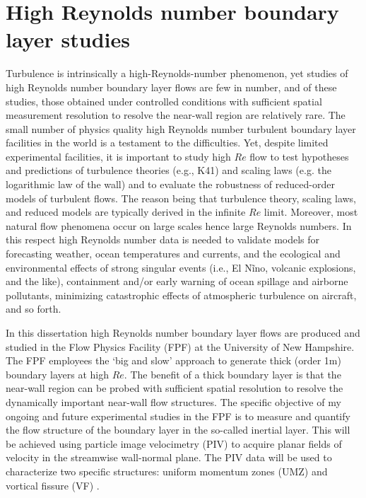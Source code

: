 \section{High Reynolds number boundary layer studies}
Turbulence is intrinsically a high-Reynolds-number phenomenon, yet studies of high Reynolds number boundary layer flows are few in number, and of these studies, those obtained under controlled conditions with sufficient spatial measurement resolution to resolve the near-wall region are relatively rare. The small number of physics quality high Reynolds number turbulent boundary layer facilities in the world is a testament to the difficulties. Yet, despite limited experimental facilities, it is important to study high $Re$ flow to test hypotheses and predictions of turbulence theories (e.g., K41) and scaling laws (e.g. the logarithmic law of the wall) and to evaluate the robustness of reduced-order models of turbulent flows. The reason being that turbulence theory, scaling laws, and reduced models are typically derived in the infinite $Re$ limit. Moreover, most natural flow phenomena occur on large scales hence large Reynolds numbers. In this respect high Reynolds number data is needed to validate models for forecasting weather, ocean temperatures and currents, and the ecological and environmental effects of strong singular events (i.e., El N\~{i}no, volcanic explosions, and the like), containment and/or early warning of ocean spillage and airborne pollutants, minimizing catastrophic effects of atmospheric turbulence on aircraft, and so forth.

In this dissertation high Reynolds number boundary layer flows are produced and studied in the Flow Physics Facility (FPF) at the University of New Hampshire. The FPF employees the `big and slow' approach to generate thick (order 1m) boundary layers at high $Re$. The benefit of a thick boundary layer is that the near-wall region can be probed with sufficient spatial resolution to resolve the dynamically important near-wall flow structures. The specific objective of my ongoing and future experimental studies in the FPF is to measure and quantify the flow structure of the boundary layer in the so-called inertial layer. This will be achieved using particle image velocimetry (PIV) to acquire planar fields of velocity in the streamwise wall-normal plane. The PIV data will be used to characterize two specific structures: uniform momentum zones (UMZ) and vortical fissure (VF)  \cite{Adrian2000}.


